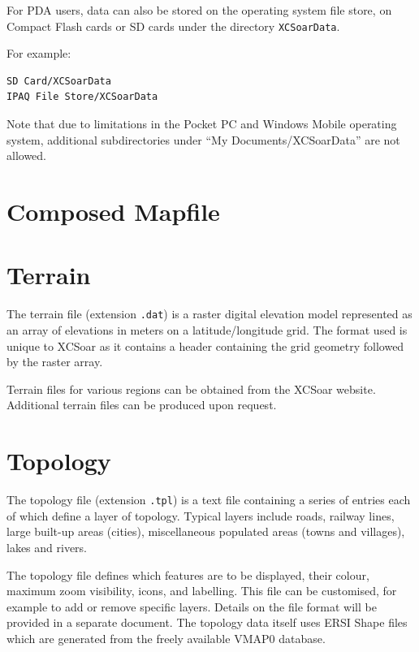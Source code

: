 \documentclass[a4paper,12pt]{refrep}
\begin{document}
For PDA users, data can also be stored on the operating system file
store, on Compact Flash cards or SD cards under the directory
\verb|XCSoarData|.

For example:
\begin{verbatim}
SD Card/XCSoarData
IPAQ File Store/XCSoarData
\end{verbatim}


Note that due to limitations in the Pocket PC and Windows Mobile
operating system, additional subdirectories under ``My
Documents/XCSoarData'' are not allowed.

\section{Composed Mapfile}


\section{Terrain}

The terrain file (extension \verb|.dat|) is a raster digital elevation
model represented as an array of elevations in meters on a
latitude/longitude grid.  The format used is unique to XCSoar as it
contains a header containing the grid geometry followed by the raster
array.

Terrain files for various regions can be obtained from the XCSoar website.
Additional terrain files can be produced upon request.

\section{Topology}

The topology file (extension \verb|.tpl|) is a text file containing a
series of entries each of which define a layer of topology.  Typical
layers include roads, railway lines, large built-up areas (cities),
miscellaneous populated areas (towns and villages), lakes and rivers.

The topology file defines which features are to be displayed, their
colour, maximum zoom visibility, icons, and labelling.  This file can
be customised, for example to add or remove specific layers.  Details
on the file format will be provided in a separate document.  The
topology data itself uses ERSI Shape files which are generated from the
freely available VMAP0 database.
\end{document}
